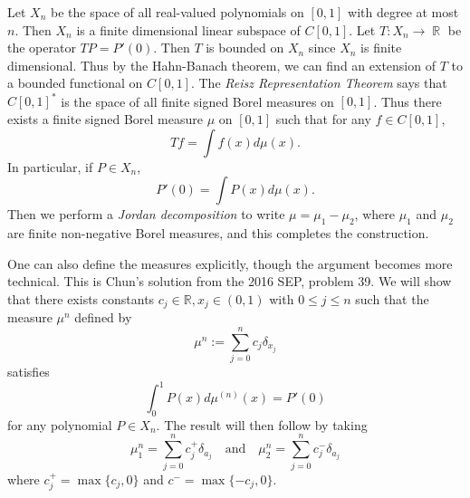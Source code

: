 \documentclass{exam}
\DeclareMathOperator{\RR}{\mathbb{R}}
\theoremstyle{problemstyle}
\newcommand{\1}[1]{\textbf{1}_{\left[#1\right]}} %
\def\R{\mathbb{R}} %
\begin{document}
\begin{questions}
\begin{parts}
\begin{solution}
	Let $X_n$ be the space of all real-valued polynomials on $[0,1]$ with degree at most $n$. Then $X_n$ is a finite dimensional linear subspace of $C[0,1]$. Let $T: X_n \to \RR$ be the operator $TP = P'(0)$. Then $T$ is bounded on $X_n$ since $X_n$ is finite dimensional. Thus by the Hahn-Banach theorem, we can find an extension of $T$ to a bounded functional on $C[0,1]$. The \emph{Reisz Representation Theorem} says that $C[0,1]^*$ is the space of all finite signed Borel measures on $[0,1]$. Thus there exists a finite signed Borel measure $\mu$ on $[0,1]$ such that for any $f \in C[0,1]$,
	\[ Tf = \int f(x) d\mu(x). \]
	In particular, if $P \in X_n$,
	\[ P'(0) = \int P(x) d\mu(x). \]
	Then we perform a \emph{Jordan decomposition} to write $\mu = \mu_1 - \mu_2$, where $\mu_1$ and $\mu_2$ are finite non-negative Borel measures, and this completes the construction.

	One can also define the measures explicitly, though the argument becomes more technical. This is Chun's solution from the 2016 SEP, problem 39. We will show that there exists constants $c_{j}\in \R, x_{j}\in (0,1)$ with $0\leq j\leq n$ such that the measure $\mu^{n}$ defined by
  \begin{equation}\label{eq:mu-form}
    \mu^{n}:= \sum_{j=0}^{n}c_{j}\delta_{x_{j}}
  \end{equation}
  satisfies
  \[ \int_0^1 P(x) d\mu^{(n)}(x) = P'(0) \]
  for any polynomial $P \in X_n$. The result will then follow by taking
  \begin{equation*}
    \mu_{1}^{n} = \sum_{j=0}^{n}c_{j}^{+}\delta_{a_{j}} \quad \text{and}\quad    \mu_{2}^{n} = \sum_{j=0}^{n}c_{j}^{-}\delta_{a_{j}}
  \end{equation*}
  where $c_{j}^{+}=\max\{c_{j},0\}$ and $c^{-}= \max\{-c_{j},0\}$.


\end{solution}
\end{parts}
\end{questions}
\end{document}
